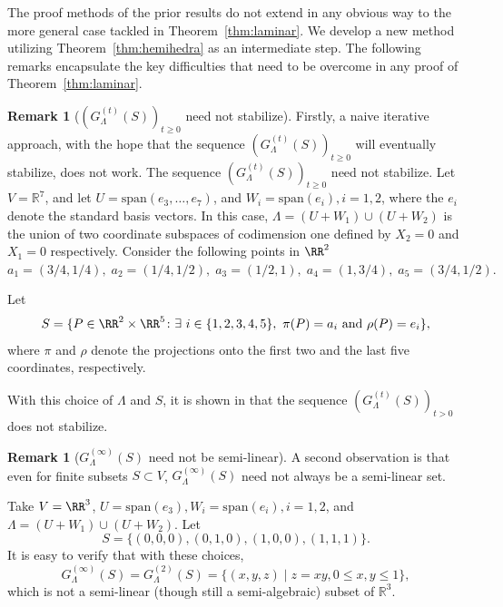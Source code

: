 \documentclass[10pt]{amsart}
\theoremstyle{plain}
\theoremstyle{definition}
\newtheorem{remark}[lemma]{Remark}
\let\leq\leqslant
\let\geq\geqslant
\begin{document}
The proof methods of the prior results do not extend in any obvious way to the more general case tackled in Theorem~\ref{thm:laminar}. We develop a new method utilizing Theorem~\ref{thm:hemihedra} as an intermediate step.
The following remarks encapsulate the key difficulties that need to be overcome in any proof of Theorem~\ref{thm:laminar}. 

\begin{remark}[$(G^{(t)}_\Lambda(S))_{t \geq 0}$ need not stabilize]
\label{rem:obs1}
Firstly, a naive iterative approach, with the hope that the sequence 
$(G^{(t)}_\Lambda(S))_{t \geq 0}$ will eventually stabilize, does not work.
The  
sequence $(G^{(t)}_\Lambda(S))_{t \geq 0}$ need not stabilize.
Let $V = \mathbb{R}^7$, and let 
$U = \mathrm{span}(e_3,\ldots,e_7)$, and $W_i = \mathrm{span}(e_i), i=1,2$,
where the $e_i$ denote the standard basis vectors.
In this case, $\Lambda = (U + W_1) \cup (U+W_2)$ is the union of two coordinate subspaces of codimension one
defined by $X_2 =0$ and $X_1=0$ respectively. 
Consider the following points in $\RR^2$  
$
a_1 = (3/4, 1/4), \;  a_2 = (1/4, 1/2), \; a_3 = (1/2, 1),\; a_4 = (1, 3/4), \;
a_5= (3/4, 1/2). 
$

Let
\begin{align*}
    S = \{P\in \RR^2 \times \RR^5 \colon   \exists\ i\in \{1,2,3,4,5\},\  \pi(P)=a_i \text{ and } \rho(P)=e_i\},
\end{align*}
where $\pi$ and $\rho$ denote the projections onto 
the first two and the last five coordinates, respectively.

With this choice of $\Lambda$ and $S$, 
it is
shown in \cite{BKMN23} that the sequence $(G_\Lambda^{(t)}(S))_{t > 0}$ does not stabilize. 
\end{remark}

\begin{remark}[$G^{(\infty)}_\Lambda(S)$ need not be semi-linear]
\label{rem:obs2}
A second observation is that
even for finite subsets $S \subset V$, $G^{(\infty)}_\Lambda(S)$
need not always be a semi-linear set. 

Take $V = \RR^3$, 
$U = \mathrm{span}(e_3), W_i = \mathrm{span}(e_i), i=1,2$, and 
$\Lambda = (U + W_1) \cup (U + W_2)$.
Let
\[
S =\{(0,0,0),(0,1,0), (1,0,0), (1,1,1)\}.
\]
It is easy to verify that with these choices,
\[
G^{(\infty)}_\Lambda(S) = G^{(2)}_\Lambda(S) = \{(x,y,z) \mid z = xy, 0 \leq x,y \leq 1\},
\]
which is not a semi-linear (though still a semi-algebraic) subset of $\mathbb{R}^3$.
\end{remark}
\end{document}
